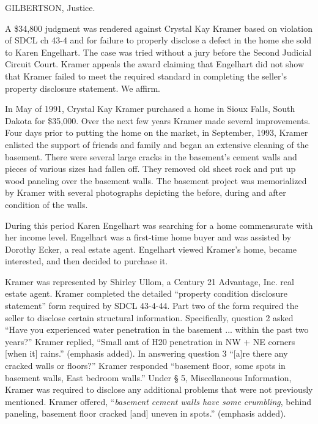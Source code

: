 

GILBERTSON, Justice.

A \$34,800 judgment was rendered against Crystal Kay Kramer based on violation
of SDCL ch 43-4 and for failure to properly disclose a defect in the home she
sold to Karen Engelhart. The case was tried without a jury before the Second
Judicial Circuit Court. Kramer appeals the award claiming that Engelhart did
not show that Kramer failed to meet the required standard in completing the
seller's property disclosure statement. We affirm.


In May of 1991, Crystal Kay Kramer purchased a home in Sioux Falls, South Dakota
for \$35,000. Over the next few years Kramer made several improvements. Four
days prior to putting the home on the market, in September, 1993, Kramer
enlisted the support of friends and family and began an extensive cleaning of
the basement. There were several large cracks in the basement's cement walls
and pieces of various sizes had fallen off. They removed old sheet rock and put
up wood paneling over the basement walls. The basement project was memorialized
by Kramer with several photographs depicting the before, during and after
condition of the walls.

During this period Karen Engelhart was searching for a home commensurate with
her income level. Engelhart was a first-time home buyer and was assisted by
Dorothy Ecker, a real estate agent. Engelhart viewed Kramer's home, became
interested, and then decided to purchase it.

Kramer was represented by Shirley Ullom, a Century 21 Advantage, Inc. real
estate agent. Kramer completed the detailed ``property condition disclosure
statement'' form required by SDCL 43-4-44. Part two of the form required the
seller to disclose certain structural information. Specifically, question 2
asked ``Have you experienced water penetration in the basement ... within the
past two years?'' Kramer replied, ``Small amt of H20 penetration in NW + NE
corners [when it] rains.'' (emphasis added). In answering question 3 ``[a]re
there any cracked walls or floors?'' Kramer responded ``basement floor, some
spots in basement walls, East bedroom walls.'' Under {\S} 5, Miscellaneous
Information, Kramer was required to disclose any additional problems that were
not previously mentioned. Kramer offered, ``\textit{basement cement walls have
some crumbling}, behind paneling, basement floor cracked [and] uneven in
spots.'' (emphasis added).

